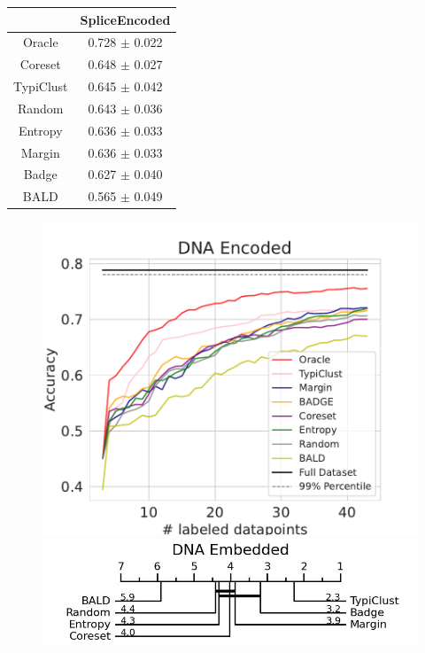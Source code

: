 \documentclass[]{article}
\begin{document}
\begin{minipage}{0.29\linewidth}
\begin{tabular}{c|c}
&SpliceEncoded \\
\hline
Oracle&0.728 $\pm$ 0.022\\
Coreset&0.648 $\pm$ 0.027\\
TypiClust&0.645 $\pm$ 0.042\\
Random&0.643 $\pm$ 0.036\\
Entropy&0.636 $\pm$ 0.033\\
Margin&0.636 $\pm$ 0.033\\
Badge&0.627 $\pm$ 0.040\\
BALD&0.565 $\pm$ 0.049\\
\end{tabular}
\end{minipage}
\begin{minipage}{0.65\linewidth}
\begin{figure}[H]
    \centering
    \includegraphics[width=\linewidth]{img/eval_dna_enc}\\ [2mm]
    \includegraphics[width=\linewidth]{img/micro_dna_enc.jpg} 
\end{figure}
\end{minipage}
\end{document}
